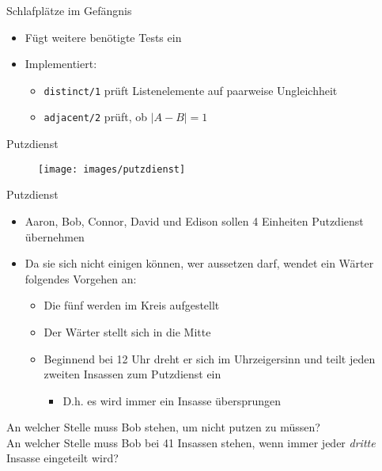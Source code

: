 \documentclass{beamer}
\begin{document}
\begin{frame}{Schlafplätze im Gefängnis}

	\begin{itemize}
		\item Fügt weitere benötigte Tests ein
		\item Implementiert:
		\begin{itemize}
			\item \texttt{distinct/1} prüft Listenelemente auf paarweise Ungleichheit
			\item \texttt{adjacent/2} prüft, ob $|A - B| = 1$
		\end{itemize}
	\end{itemize}
\end{frame}


\begin{frame}{Putzdienst}
	\begin{figure}
		\texttt{[image: images/putzdienst]}
	\end{figure}
\end{frame}

\begin{frame}{Putzdienst}
	\begin{itemize}
		\item Aaron, Bob, Connor, David und Edison sollen 4 Einheiten Putzdienst übernehmen
		\item Da sie sich nicht einigen können, wer aussetzen darf, wendet ein Wärter folgendes Vorgehen an:
		\begin{itemize}
			\item Die fünf werden im Kreis aufgestellt
			\item Der Wärter stellt sich in die Mitte
			\item Beginnend bei 12 Uhr dreht er sich im Uhrzeigersinn und teilt jeden zweiten Insassen zum Putzdienst ein
			\begin{itemize}
				\item D.h. es wird immer ein Insasse übersprungen
			\end{itemize}
		\end{itemize}
	\end{itemize}

	An welcher Stelle muss Bob stehen, um nicht putzen zu müssen?\\
	\pause
	An welcher Stelle muss Bob bei 41 Insassen stehen, wenn immer jeder \emph{dritte} Insasse eingeteilt wird?
\end{frame}
\end{document}
